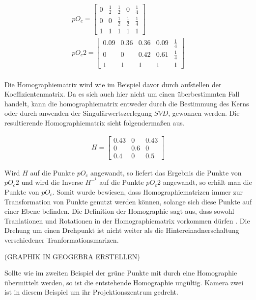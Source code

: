  \begin{gather}
 	pO_c = 
 	\begin{bmatrix}
 	0&\frac{1}{2}&\frac{1}{2}&0&\frac{1}{4}\\
 	0&0&\frac{1}{2}&\frac{1}{2}&\frac{1}{4}\\
 	1&1&1&1&1
 	\end{bmatrix}\\
 	pO_c2=
 		\begin{bmatrix}
 	0.09&0.36&0.36&0.09&\frac{1}{4}\\
 	0&0&0.42&0.61&\frac{1}{4}\\
 	1&1&1&1&1
 	\end{bmatrix}\\
 \end{gather}

Die Homographiematrix wird wie im Beispiel davor durch aufstellen der Koeffizientenmatrix. Da es sich auch hier nicht um einen überbestimmten Fall handelt, kann die homographiematrix entweder durch die Bestimmung des Kerns oder durch anwenden der Singulärwertszerlegung $SVD$, gewonnen werden. Die resultierende Homographiematrix sieht folgendermaßen aus.

\begin{gather}
	H = \begin{bmatrix}
	0.43&0&0.43\\
	0&0.6&0\\
	0.4&0&0.5
	\end{bmatrix}
\end{gather}

Wird $H$ auf die Punkte $pO_c$ angewandt, so liefert das Ergebnis die Punkte von $pO_c2$ und wird die Inverse $H^{-^1}$ auf die Punkte $pO_c2$ angewandt, so erhält man die Punkte von $pO_c$. Somit wurde bewiesen, dass Homographiematrizen immer zur Transformation von Punkte genutzt werden können, solange sich diese Punkte auf einer Ebene befinden. Die Definition der Homographie sagt aus, dass sowohl Tranlationen und Rotationen in der Homographiematrix vorkommen dürfen \cite{Roser} \cite{Peiffer}. Die Drehung um einen Drehpunkt ist nicht weiter als die Hintereinadnerschaltung verschiedener Tranformationsmarizen. 

(GRAPHIK IN GEOGEBRA ERSTELLEN) 


 Sollte wie im zweiten Beispiel der grüne Punkte mit durch eine Homographie übermittelt werden, so ist die entstehende Homographie ungültig. Kamera zwei ist in diesem Beispiel um ihr Projektionszentrum gedreht.\\

